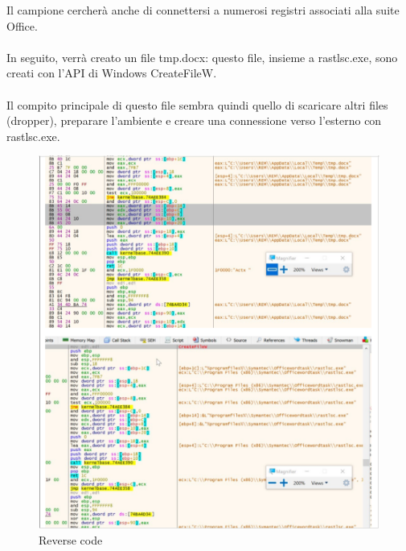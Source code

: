 \documentclass{article}
\begin{document}
\noindent
Il campione cercherà anche di connettersi a numerosi registri associati alla suite Office.\\\\
In seguito, verrà creato un file tmp.docx: questo file, insieme a rastlsc.exe, 
sono creati con l’API di Windows CreateFileW.\\\\
Il compito principale di questo file sembra quindi quello di scaricare altri files (dropper), 
preparare l’ambiente e creare una connessione verso l’esterno con rastlsc.exe.
\begin{figure}[H]
    \center
    \includegraphics[scale=0.4]{images/OceanLotus2.png}
    \caption{Reverse code}\label{fig:1}
\end{figure}
\end{document}

